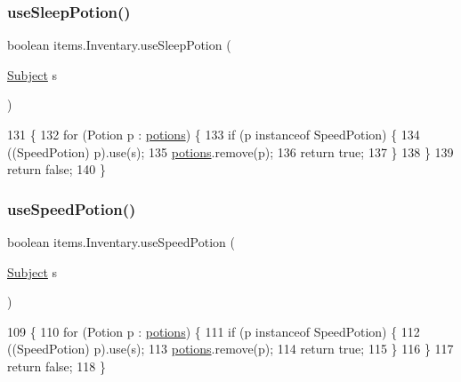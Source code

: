 \subsubsection{\texorpdfstring{use\+Sleep\+Potion()}{useSleepPotion()}}
{\footnotesize\ttfamily boolean items.\+Inventary.\+use\+Sleep\+Potion (\begin{DoxyParamCaption}\item[{\mbox{\hyperlink{classentities_1_1_subject}{Subject}}}]{s }\end{DoxyParamCaption})\hspace{0.3cm}{\ttfamily [inline]}}


\begin{DoxyCode}
131                                              \{
132         \textcolor{keywordflow}{for} (Potion p : \mbox{\hyperlink{classitems_1_1_inventary_afa542455e08a2cc05377133889b7b091}{potions}}) \{
133             \textcolor{keywordflow}{if} (p instanceof SpeedPotion) \{
134                 ((SpeedPotion) p).use(s);
135                 \mbox{\hyperlink{classitems_1_1_inventary_afa542455e08a2cc05377133889b7b091}{potions}}.remove(p);
136                 \textcolor{keywordflow}{return} \textcolor{keyword}{true};
137             \}
138         \}
139         \textcolor{keywordflow}{return} \textcolor{keyword}{false};
140     \}
\end{DoxyCode}
\mbox{\label{classitems_1_1_inventary_ac1eb691e8eacc5e30ae323ed5517af89}} 
\subsubsection{\texorpdfstring{use\+Speed\+Potion()}{useSpeedPotion()}}
{\footnotesize\ttfamily boolean items.\+Inventary.\+use\+Speed\+Potion (\begin{DoxyParamCaption}\item[{\mbox{\hyperlink{classentities_1_1_subject}{Subject}}}]{s }\end{DoxyParamCaption})\hspace{0.3cm}{\ttfamily [inline]}}


\begin{DoxyCode}
109                                              \{
110         \textcolor{keywordflow}{for} (Potion p : \mbox{\hyperlink{classitems_1_1_inventary_afa542455e08a2cc05377133889b7b091}{potions}}) \{
111             \textcolor{keywordflow}{if} (p instanceof SpeedPotion) \{
112                 ((SpeedPotion) p).use(s);
113                 \mbox{\hyperlink{classitems_1_1_inventary_afa542455e08a2cc05377133889b7b091}{potions}}.remove(p);
114                 \textcolor{keywordflow}{return} \textcolor{keyword}{true};
115             \}
116         \}
117         \textcolor{keywordflow}{return} \textcolor{keyword}{false};
118     \}
\end{DoxyCode}


